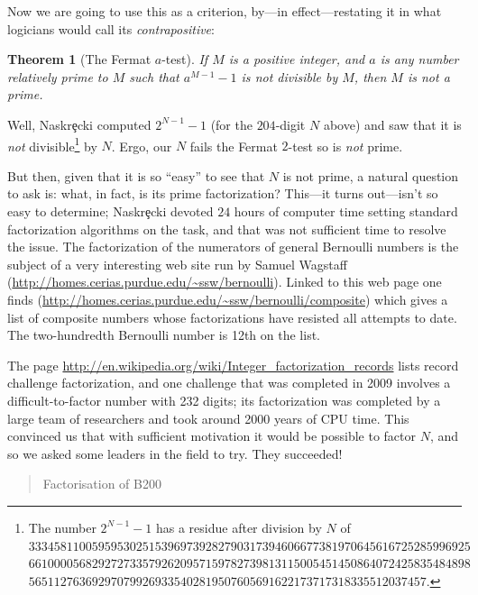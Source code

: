 \documentclass[openany]{book}
\theoremstyle{plain}
\newtheorem{theorem}{Theorem}[chapter]
\theoremstyle{definition}
\begin{document}
{ Now we are going to use this as a criterion, by---in effect---restating it in what logicians would call  its {\it contrapositive}:
 \begin{theorem}[The Fermat $a$-test]
If $M$ is a positive integer, and $a$ is any number relatively prime to $M$ such that  $a^{M-1} - 1$ is {\it not} divisible by $M$, then $M$ is {\it not} a prime.
\end{theorem}

Well, Naskr\c{e}cki computed $2^{N-1}-1$  (for the $204$-digit $N$ above)   and saw that
it is {\it not} divisible\footnote{The number $2^{N-1}-1$ has a residue after division by $N$ of\\ $3334581100595953025153969739282790317394606677381970645616725285996925$\newline$
 6610000568292727335792620957159782739813115005451450864072425835484898$\newline$
 565112763692970799269335402819507605691622173717318335512037457$.} by $N$.
Ergo, our $N$ fails the  Fermat $2$-test so is {\it not} prime.

But then, given that it is so ``easy'' to see that $N$ is not prime, a
natural question to ask is: what, in fact, is its prime factorization?
This---it turns out---isn't so easy to determine;
Naskr\c{e}cki devoted $24$ hours of computer time setting standard  factorization
algorithms on the task, and that was not sufficient time to resolve
the issue.  The factorization of the numerators of general Bernoulli
numbers is the subject of a very interesting web site run by Samuel
Wagstaff (\url{http://homes.cerias.purdue.edu/~ssw/bernoulli}).
Linked to this web page one finds
(\url{http://homes.cerias.purdue.edu/~ssw/bernoulli/composite}) which gives
a list of composite numbers whose factorizations have resisted all
attempts to date.  The two-hundredth Bernoulli number is 12th on the list.

 The page
\url{http://en.wikipedia.org/wiki/Integer_factorization_records} lists
record challenge factorization, and one challenge that was completed
in 2009 involves a difficult-to-factor number with 232 digits; its
factorization was completed by a large team of researchers and took around
2000 years of CPU time.  This convinced us that
with sufficient motivation  it would be possible to factor $N$, and so we
asked some leaders in the field to try.   They succeeded!
\begin{quote}\sf
Factorisation of B200


\end{quote}}
\end{document}
